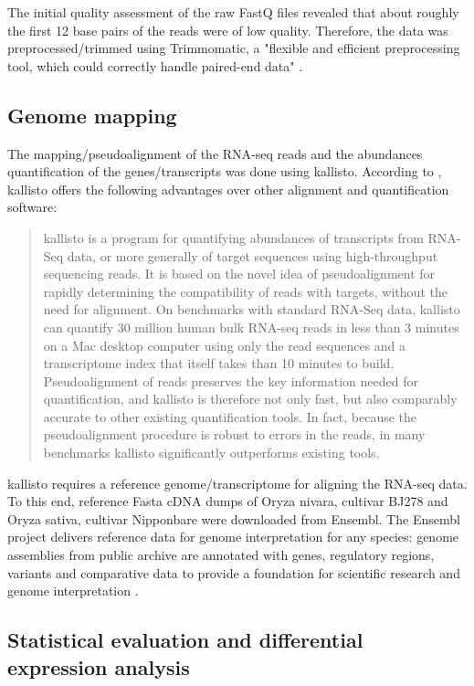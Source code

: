 The initial quality assessment of the raw FastQ files revealed that about roughly the first 12 base pairs of the reads were of low quality. Therefore, the data was preprocessed/trimmed using Trimmomatic, a "flexible and efficient preprocessing tool, which could correctly handle paired-end data" \autocite{10.1093/bioinformatics/btw354}.


\subsection{Genome mapping}

The mapping/pseudoalignment of the RNA-seq reads and the abundances quantification of the genes/transcripts was done using kallisto. According to \autocite{10.1038/nbt.3519}, kallisto offers the following advantages over other alignment and quantification software:
\begin{quote}
    kallisto is a program for quantifying abundances of transcripts from RNA-Seq data, or more generally of target sequences using high-throughput sequencing reads. It is based on the novel idea of pseudoalignment for rapidly determining the compatibility of reads with targets, without the need for alignment. On benchmarks with standard RNA-Seq data, kallisto can quantify 30 million human bulk RNA-seq reads in less than 3 minutes on a Mac desktop computer using only the read sequences and a transcriptome index that itself takes than 10 minutes to build. Pseudoalignment of reads preserves the key information needed for quantification, and kallisto is therefore not only fast, but also comparably accurate to other existing quantification tools. In fact, because the pseudoalignment procedure is robust to errors in the reads, in many benchmarks kallisto significantly outperforms existing tools.
\end{quote}

kallisto requires a reference genome/transcriptome for aligning the RNA-seq data. To this end, reference Fasta cDNA dumps of Oryza nivara, cultivar BJ278 and Oryza sativa, cultivar Nipponbare were downloaded from Ensembl. The Ensembl project delivers reference data for genome interpretation for any species: genome assemblies from public archive are annotated with genes, regulatory regions, variants and comparative data to provide a foundation for scientific research and genome interpretation \autocite{10.1093/bioinformatics/btu170}.


\subsection{Statistical evaluation and differential expression analysis}

